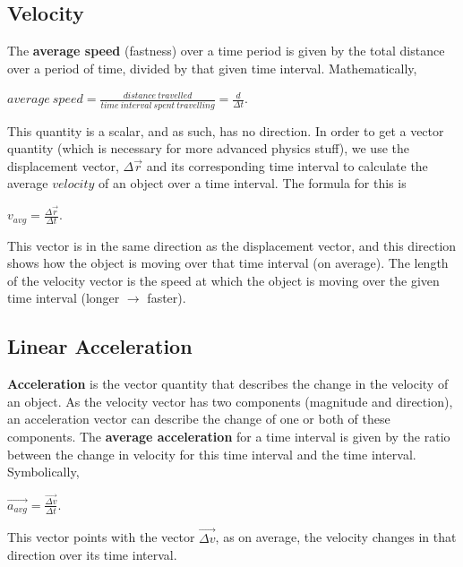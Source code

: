 \documentclass[12pt,letterpaper]{article}
\begin{document}
\subsection[Velocity]{Velocity}

The \textbf{average speed} (fastness) over a time period is given by the total distance over a period of time, divided by that given time interval. Mathematically, 

\begin{center}
$average\ speed=\frac{distance\ travelled}{time\ interval\ spent\ travelling}=\frac{d}{\Delta t}$.
\end{center}

This quantity is a scalar, and as such, has no direction. In order to get a vector quantity (which is necessary for more advanced physics stuff), we use the displacement vector, $\Delta\vec{r}$ and its corresponding time interval to calculate the average $velocity$ of an object over a time interval. The formula for this is

\begin{center}
$v_{avg}=\frac{\Delta\vec{r}}{\Delta t}$.
\end{center}

This vector is in the same direction as the displacement vector, and this direction shows how the object is moving over that time interval (on average). The length of the velocity vector is the speed at which the object is moving over the given time interval (longer $\rightarrow$ faster).

\subsection[Linear Acceleration]{Linear Acceleration}

\textbf{Acceleration} is the vector quantity that describes the change in the velocity of an object. As the velocity vector has two components (magnitude and direction), an acceleration vector can describe the change of one or both of these components. The \textbf{average acceleration} for a time interval is given by the ratio between the change in velocity for this time interval and the time interval. Symbolically,

\begin{center}
$\vec{a_{avg}}=\frac{\vec{\Delta v}}{\Delta t}$.
\end{center}

This vector points with the vector $\vec{\Delta v}$, as on average, the velocity changes in that direction over its time interval. \\
\end{document}
